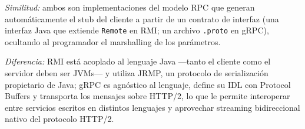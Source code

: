 \begin{enumerate}[label=\arabic*.]
\emph{Similitud:} ambos son implementaciones del modelo RPC que generan automáticamente el stub del cliente a partir de un contrato de interfaz (una interfaz Java que extiende \texttt{Remote} en RMI; un archivo \texttt{.proto} en gRPC), ocultando al programador el marshalling de los parámetros.

\emph{Diferencia:} RMI está acoplado al lenguaje Java —tanto el cliente como el servidor deben ser JVMs— y utiliza JRMP, un protocolo de serialización propietario de Java; gRPC es agnóstico al lenguaje, define su IDL con Protocol Buffers y transporta los mensajes sobre HTTP/2, lo que le permite interoperar entre servicios escritos en distintos lenguajes y aprovechar streaming bidireccional nativo del protocolo HTTP/2.

\end{enumerate}

